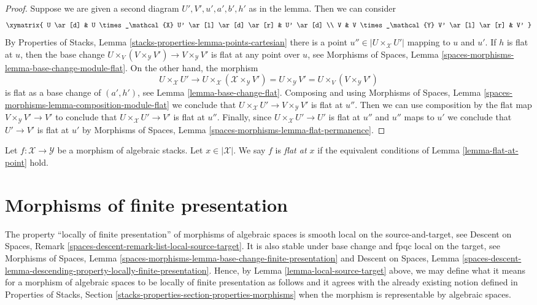 \begin{proof}
Suppose we are given a second diagram $U', V', u', a', b', h'$ as
in the lemma. Then we can consider
$$
\xymatrix{
U \ar[d] & U \times_\mathcal{X} U' \ar[l] \ar[d] \ar[r] & U' \ar[d] \\
V & V \times_\mathcal{Y} V' \ar[l] \ar[r] & V'
}
$$
By Properties of Stacks, Lemma \ref{stacks-properties-lemma-points-cartesian}
there is a point $u'' \in |U \times_\mathcal{X} U'|$ mapping
to $u$ and $u'$. If $h$ is flat at $u$, then the base change
$U \times_V (V \times_\mathcal{Y} V') \to V \times_\mathcal{Y} V'$
is flat at any point over $u$, see
Morphisms of Spaces, Lemma \ref{spaces-morphisms-lemma-base-change-module-flat}.
On the other hand, the morphism
$$
U \times_\mathcal{X} U' \to
U \times_\mathcal{X} (\mathcal{X} \times_\mathcal{Y} V') =
U \times_\mathcal{Y} V' =
U \times_V (V \times_\mathcal{Y} V')
$$
is flat as a base change of $(a', h')$, see Lemma \ref{lemma-base-change-flat}.
Composing and using
Morphisms of Spaces, Lemma \ref{spaces-morphisms-lemma-composition-module-flat}
we conclude that $U \times_\mathcal{X} U' \to V \times_\mathcal{Y} V'$
is flat at $u''$. Then we can use composition by the flat map
$V \times_\mathcal{Y} V' \to V'$ to conclude that
$U \times_\mathcal{X} U' \to V'$ is flat at $u''$.
Finally, since $U \times_\mathcal{X} U' \to U'$ is flat
at $u''$ and $u''$ maps to $u'$ we conclude that
$U' \to V'$ is flat at $u'$ by
Morphisms of Spaces, Lemma \ref{spaces-morphisms-lemma-flat-permanence}.
\end{proof}

\begin{definition}
\label{definition-flat-at-point}
Let $f : \mathcal{X} \to \mathcal{Y}$ be a morphism of algebraic stacks.
Let $x \in |\mathcal{X}|$. We say $f$ is {\it flat at $x$} if the
equivalent conditions of Lemma \ref{lemma-flat-at-point} hold.
\end{definition}





\section{Morphisms of finite presentation}
\label{section-finite-presentation}

\noindent
The property ``locally of finite presentation'' of morphisms of algebraic
spaces is smooth local on the source-and-target, see
Descent on Spaces, Remark \ref{spaces-descent-remark-list-local-source-target}.
It is also stable under base change and fpqc local on the target, see
Morphisms of Spaces,
Lemma \ref{spaces-morphisms-lemma-base-change-finite-presentation}
and
Descent on Spaces, Lemma
\ref{spaces-descent-lemma-descending-property-locally-finite-presentation}.
Hence, by
Lemma \ref{lemma-local-source-target}
above, we may define what it means for a morphism of algebraic spaces
to be locally of finite presentation as follows and it agrees with the already
existing notion defined in
Properties of Stacks,
Section \ref{stacks-properties-section-properties-morphisms}
when the morphism is representable by algebraic spaces.


